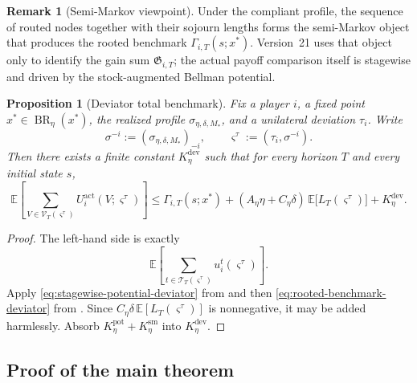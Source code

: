 \documentclass[12pt]{article}
\newtheorem{proposition}[theorem]{Proposition}
\theoremstyle{definition}
\newtheorem{remark}[theorem]{Remark}
\newcommand{\E}{\mathbb{E}}
\newcommand{\1}{\mathbf{1}}
\DeclareMathOperator{\BR}{BR}
\begin{document}
\begin{remark}[Semi-Markov viewpoint]
Under the compliant profile, the sequence of routed nodes together with their
sojourn lengths forms the semi-Markov object that produces the rooted benchmark
$\Gamma_{i,T}(s;x^*)$. Version~21 uses that object only to identify the gain sum
$\mathfrak G_{i,T}$; the actual payoff comparison itself is stagewise and driven
by the stock-augmented Bellman potential.
\end{remark}

\begin{proposition}[Deviator total benchmark]
\label{prop:deviation-total}
Fix a player $i$, a fixed point $x^*\in\BR_\eta(x^*)$, the realized profile
$\sigma_{\eta,\delta,M_*}$, and a unilateral deviation $\tau_i$. Write
\[
\sigma^{-i}:=(\sigma_{\eta,\delta,M_*})_{-i},
\qquad
\varsigma^\tau:=(\tau_i,\sigma^{-i}).
\]
Then there exists a finite constant $K_\eta^{\mathrm{dev}}$ such that for every
horizon $T$ and every initial state $s$,
\begin{equation}
\label{eq:deviation-total}
\E\left[
\sum_{V\in\mathcal V_T(\varsigma^\tau)}
U_i^{\mathrm{act}}(V;\varsigma^\tau)
\right]
\le
\Gamma_{i,T}(s;x^*)
+
(A_\eta\eta+C_\eta\delta)\,
\E\bigl[L_T(\varsigma^\tau)\bigr]
+
K_\eta^{\mathrm{dev}}.
\end{equation}
\end{proposition}

\begin{proof}
The left-hand side is exactly
\[
\E\left[
\sum_{t\in\mathcal T_T(\varsigma^\tau)}
u_i^t(\varsigma^\tau)
\right].
\]
Apply \eqref{eq:stagewise-potential-deviator} from
 and then \eqref{eq:rooted-benchmark-deviator} from
. Since $C_\eta\delta\,\E[L_T(\varsigma^\tau)]$ is
nonnegative, it may be added harmlessly. Absorb
$K_\eta^{\mathrm{pot}}+K_\eta^{\mathrm{sm}}$ into $K_\eta^{\mathrm{dev}}$.
\end{proof}

\subsection{Proof of the main theorem}
\end{document}
